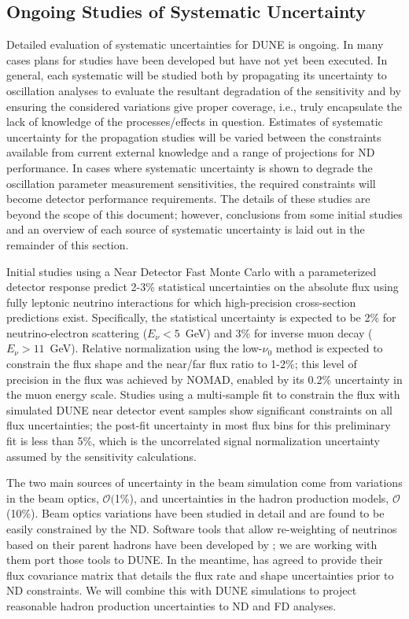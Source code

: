 \subsection{Ongoing Studies of Systematic Uncertainty}
\label{sec:syst_studies_ind}
Detailed evaluation of systematic uncertainties for DUNE is ongoing. In many cases plans for studies
have been developed but have not yet been executed. In general, each systematic will be studied both by
propagating its uncertainty to oscillation analyses to evaluate the resultant degradation of the sensitivity
and by ensuring the considered variations give proper coverage, i.e., truly encapsulate
the lack of knowledge of the processes/effects in question. Estimates of systematic uncertainty for the 
propagation studies will be varied between the constraints available from current external knowledge
and a range of projections for ND performance. In cases where systematic uncertainty is shown to
degrade the oscillation parameter
measurement sensitivities, the required constraints will become detector performance requirements.
The details of these studies are beyond the scope of this document; however, conclusions from some
initial studies and an overview of each source of systematic uncertainty is laid out in the remainder of
this section.

Initial studies using a Near Detector Fast Monte Carlo with a parameterized detector response
predict 2-3\% statistical uncertainties on the absolute flux using fully 
leptonic neutrino interactions for which high-precision cross-section predictions 
exist. Specifically,
the statistical uncertainty is expected to be 2\% for neutrino-electron
scattering ($E_\nu<5$~GeV) and 3\% for inverse muon decay ($E_\nu>11$~GeV).
Relative normalization using the low-$\nu_0$ method is
expected to constrain the flux shape and the near/far flux ratio to 1-2\%; this level of
precision in the \numu flux was achieved by NOMAD\cite{We:2007ab,Lyubushkin:2008pe}, enabled by its 0.2\%
uncertainty in the muon energy scale.
Studies using a multi-sample fit  to constrain the flux with simulated DUNE near detector
event samples show significant constraints on all flux
uncertainties; the post-fit uncertainty in most flux bins for this preliminary fit is less
than 5\%, which is the uncorrelated \numu signal normalization
uncertainty assumed by the sensitivity calculations. 

The two main sources of uncertainty in the beam simulation come from variations in the beam optics,
$\mathcal{O}($1\%), and uncertainties in the hadron production models, $\mathcal{O}$(10\%).
Beam optics variations have been studied in detail
and are found to be easily constrained by the ND. Software tools that
allow re-weighting of neutrinos based on their parent hadrons have been developed by \minerva; we are working with
them port those tools to DUNE. In the meantime, \minerva has agreed to provide their flux covariance matrix
that details the flux rate and shape uncertainties prior to ND constraints. We will combine this with DUNE
simulations to project reasonable hadron production uncertainties to ND and FD analyses.

